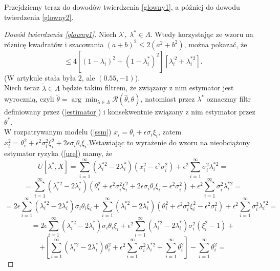 \documentclass{article}
\begin{document}
Przejdziemy teraz do dowodów twierdzenia \ref{glowny1}, a później do dowodu twierdzenia \ref{glowny2}.
\begin{proof}[Dowód twierdzenia \ref{glowny1}]
Niech $\lambda^{\cdot},\ \lambda^*\in \Lambda$. Wtedy korzystając ze wzoru na różnicę kwadratów i szacowania $(a+b)^2\leq 2(a^2+b^2)$, można pokazać, że
\begin{displaymath}
[(1-\lambda_i^{\cdot})^2-(1-\lambda_i^*)^2]\leq 4[(1-\lambda_i^{\cdot})^2+(1-\lambda_i^*)^2][\lambda_i^{\cdot 2}+\lambda_i^{*2}].
\end{displaymath}
(W artykule stała była $2$, ale $(0.55,-1)$).\\
Niech teraz $\tilde{\lambda}\in \Lambda$ będzie takim filtrem, że związany z nim estymator jest wyrocznią, czyli $\tilde{\theta}=\arg \min_{\lambda\in \Lambda}\mathcal{R}(\hat{\theta},\theta)$, natomiast przez $\lambda^*$ oznaczmy filtr definiowany przez (\ref{estimator}) i konsekwentnie związany z nim estymator przez $\theta^*$.\\
W rozpatrywanym modelu (\ref{ssm}) $x_i=\theta_i+\epsilon\sigma_i\xi_i$, zatem $x_i^2=\theta_i^2+\epsilon^2\sigma_i^2\xi_i^2+2\epsilon\sigma_i\theta_i\xi_i$.Wstawiając to wyrażenie do wzoru na nieobciążony estymator ryzyka (\ref{ure}) mamy, że
\begin{displaymath}
U[\lambda^*,X]=\sum_{i=1}^{\infty}(\lambda_i^{*2}-2\lambda_i^*)(x_i^2-\epsilon^2\sigma_i^2)+\epsilon^2\sum_{i=1}^{\infty}\sigma_i^2\lambda_i^{*2}=
\end{displaymath}
\begin{displaymath}
=\sum_{i=1}^{\infty}(\lambda_i^{*2}-2\lambda_i^*)(\theta_i^2+\epsilon^2\sigma_i^2\xi_i^2+2\epsilon\sigma_i\theta_i\xi_i-\epsilon^2\sigma_i^2)+\epsilon^2\sum_{i=1}^{\infty}\sigma_i^2\lambda_i^{*2}=
\end{displaymath}
\begin{displaymath}
=2\epsilon\sum_{i=1}^{\infty}(\lambda_i^{*2}-2\lambda_i^*)\sigma_i\theta_i\xi_i+\sum_{i=1}^{\infty}(\lambda_i^{*2}-2\lambda_i^*)(\theta_i^2+\epsilon^2\sigma_i^2\xi_i^2-\epsilon^2\sigma_i^2)+\epsilon^2\sum_{i=1}^{\infty}\sigma_i^2\lambda_i^{*2}=
\end{displaymath}
\begin{displaymath}
=2\epsilon\sum_{i=1}^{\infty}(\lambda_i^{*2}-2\lambda_i^*)\sigma_i\theta_i\xi_i+\epsilon^2\sum_{i=1}^{\infty}(\lambda_i^{*2}-2\lambda_i^*)\sigma_i^2(\xi_i^2-1)+
\end{displaymath}
\begin{displaymath}
+\left[\sum_{i=1}^{\infty}(\lambda_i^{*2}-2\lambda_i^*)\theta_i^2+\epsilon^2\sum_{i=1}^{\infty}\sigma_i^2\lambda_i^{*2}+\sum_{i=1}^{\infty}\theta_i^2\right]-\sum_{i=1}^{\infty}\theta_i^2=

\end{displaymath}
\end{proof}
\end{document}
